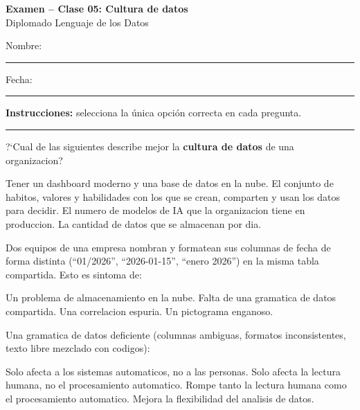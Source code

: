 \documentclass[12pt,addpoints]{exam}
\begin{document}
\begin{center}
  {\color{molMorado}\Large\bfseries Examen -- Clase 05: Cultura de datos}\\[3pt]
  {\color{molTeal}\large Diplomado Lenguaje de los Datos}
\end{center}

\vspace{6pt}
\noindent Nombre: \rule{6cm}{0.4pt} \hfill Fecha: \rule{3cm}{0.4pt}

\vspace{6pt}
\noindent\textbf{Instrucciones:} selecciona la \'unica opci\'on correcta en cada
pregunta.

\vspace{4pt}
\hrule
\vspace{8pt}

\begin{questions}

\question[1] ?`Cual de las siguientes describe mejor la \textbf{cultura de
datos} de una organizacion?
\begin{choices}
  \choice Tener un dashboard moderno y una base de datos en la nube.
  \CorrectChoice El conjunto de habitos, valores y habilidades con los que se
    crean, comparten y usan los datos para decidir.
  \choice El numero de modelos de IA que la organizacion tiene en produccion.
  \choice La cantidad de datos que se almacenan por dia.
\end{choices}

\question[1] Dos equipos de una empresa nombran y formatean sus columnas de
fecha de forma distinta (``01/2026'', ``2026-01-15'', ``enero 2026'') en la
misma tabla compartida. Esto es sintoma de:
\begin{choices}
  \choice Un problema de almacenamiento en la nube.
  \CorrectChoice Falta de una gramatica de datos compartida.
  \choice Una correlacion espuria.
  \choice Un pictograma enganoso.
\end{choices}

\question[1] Una gramatica de datos deficiente (columnas ambiguas, formatos
inconsistentes, texto libre mezclado con codigos):
\begin{choices}
  \choice Solo afecta a los sistemas automaticos, no a las personas.
  \choice Solo afecta la lectura humana, no el procesamiento automatico.
  \CorrectChoice Rompe tanto la lectura humana como el procesamiento
    automatico.
  \choice Mejora la flexibilidad del analisis de datos.
\end{choices}


\end{questions}
\end{document}

